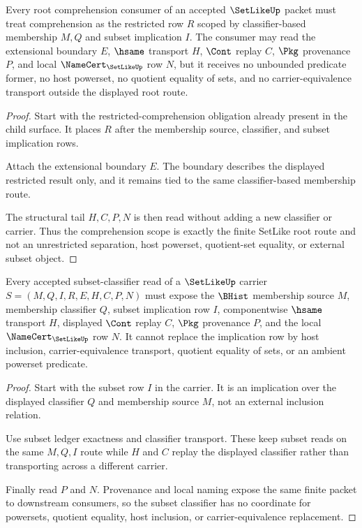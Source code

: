 \begin{theorem}
\label{thm:setlike-root-comprehension-scope}
Every root comprehension consumer of an accepted $\SetLikeUp$ packet must treat comprehension as the restricted row $R$ scoped by classifier-based membership $M,Q$ and subset implication $I$. The consumer may read the extensional boundary $E$, $\hsame$ transport $H$, $\Cont$ replay $C$, $\Pkg$ provenance $P$, and local $\NameCert_{\SetLikeUp}$ row $N$, but it receives no unbounded predicate former, no host powerset, no quotient equality of sets, and no carrier-equivalence transport outside the displayed root route.
\end{theorem}
\begin{proof}
Start with the restricted-comprehension obligation already present in the child surface. It places $R$ after the membership source, classifier, and subset implication rows.

Attach the extensional boundary $E$. The boundary describes the displayed restricted result only, and it remains tied to the same classifier-based membership route.

The structural tail $H,C,P,N$ is then read without adding a new classifier or carrier. Thus the comprehension scope is exactly the finite SetLike root route and not an unrestricted separation, host powerset, quotient-set equality, or external subset object.
\end{proof}

\begin{theorem}
\label{thm:setlike-subset-classifier-obligation}
Every accepted subset-classifier read of a $\SetLikeUp$ carrier $S=(M,Q,I,R,E,H,C,P,N)$ must expose the $\BHist$ membership source $M$, membership classifier $Q$, subset implication row $I$, componentwise $\hsame$ transport $H$, displayed $\Cont$ replay $C$, $\Pkg$ provenance $P$, and the local $\NameCert_{\SetLikeUp}$ row $N$. It cannot replace the implication row by host inclusion, carrier-equivalence transport, quotient equality of sets, or an ambient powerset predicate.
\end{theorem}
\begin{proof}
Start with the subset row $I$ in the carrier. It is an implication over the displayed classifier $Q$ and membership source $M$, not an external inclusion relation.

Use subset ledger exactness and classifier transport. These keep subset reads on the same $M,Q,I$ route while $H$ and $C$ replay the displayed classifier rather than transporting across a different carrier.

Finally read $P$ and $N$. Provenance and local naming expose the same finite packet to downstream consumers, so the subset classifier has no coordinate for powersets, quotient equality, host inclusion, or carrier-equivalence replacement.
\end{proof}

